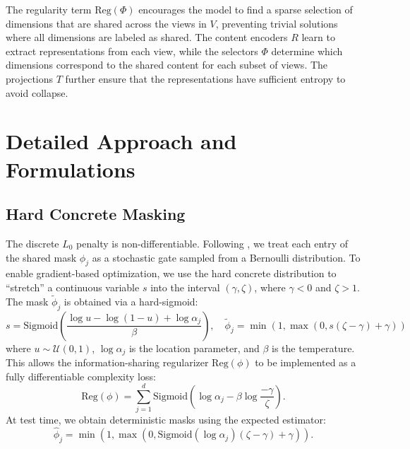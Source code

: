 \documentclass[a4paper,12pt]{article}
\begin{document}
The regularity term $\text{Reg}(\Phi)$ encourages the model to find a sparse selection of dimensions that are shared across the views in $V$, preventing trivial solutions where all dimensions are labeled as shared. The content encoders $R$ learn to extract representations from each view, while the selectors $\Phi$ determine which dimensions correspond to the shared content for each subset of views. The projections $T$ further ensure that the representations have sufficient entropy to avoid collapse.

\section{Detailed Approach and Formulations} \label{app:approach_details}

\subsection{Hard Concrete Masking}
The discrete $L_0$ penalty is non-differentiable. Following \cite{louizos2018learningsparseneuralnetworks}, we treat each entry of the shared mask $\phi_j$ as a stochastic gate sampled from a Bernoulli distribution. To enable gradient-based optimization, we use the hard concrete distribution to ``stretch'' a continuous variable $s$ into the interval $(\gamma, \zeta)$, where $\gamma < 0$ and $\zeta > 1$. The mask $\tilde{\phi}_j$ is obtained via a hard-sigmoid:
\begin{equation}
  s = \text{Sigmoid} \left( \frac{\log u - \log(1-u) + \log \alpha_j}{\beta} \right), \quad \tilde{\phi}_j = \min(1, \max(0, s(\zeta - \gamma) + \gamma))
\end{equation}
where $u \sim \mathcal{U}(0,1)$, $\log \alpha_j$ is the location parameter, and $\beta$ is the temperature. This allows the information-sharing regularizer $\text{Reg}(\phi)$ to be implemented as a fully differentiable complexity loss:
\begin{equation}
  \text{Reg}(\phi) = \sum_{j=1}^d \text{Sigmoid}\left(\log \alpha_j - \beta \log \frac{-\gamma}{\zeta}\right).
\end{equation}
At test time, we obtain deterministic masks using the expected estimator:
\begin{equation}
  \hat{\phi}_j = \min(1, \max(0, \text{Sigmoid}(\log \alpha_j)(\zeta - \gamma) + \gamma)).
\end{equation}
\end{document}
